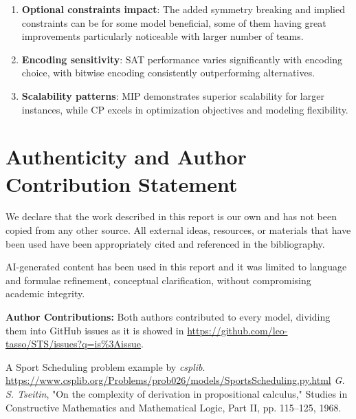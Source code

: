 \documentclass[11pt]{article}
\begin{document}
\begin{enumerate}    
    \item \textbf{Optional constraints impact}: The added symmetry breaking and implied constraints can be for some model beneficial, some of them having great improvements particularly noticeable with larger number of teams.
    
    \item \textbf{Encoding sensitivity}: SAT performance varies significantly with encoding choice, with bitwise encoding consistently outperforming alternatives.
    
    \item \textbf{Scalability patterns}: MIP demonstrates superior scalability for larger instances, while CP excels in optimization objectives and modeling flexibility.
\end{enumerate}

\newpage
\section*{Authenticity and Author Contribution Statement}

We declare that the work described in this report is our own and has not been copied from any other source. All external ideas, resources, or materials that have been used have been appropriately cited and referenced in the bibliography.

AI-generated content has been used in this report and it was limited to language and formulae refinement, conceptual clarification, without compromising academic integrity.

\noindent \textbf{Author Contributions:}
Both authors contributed to every model, dividing them into GitHub issues as it is showed in \url{https://github.com/leo-tasso/STS/issues?q=is%3Aissue}.



\begin{thebibliography}{99}

A Sport Scheduling problem example by \textit{csplib}.\\
\url{https://www.csplib.org/Problems/prob026/models/SportsScheduling.py.html}
\textit{G. S. Tseitin}, "On the complexity of derivation in propositional calculus," Studies in Constructive Mathematics and Mathematical Logic, Part II, pp. 115–125, 1968.

\end{thebibliography}
\end{document}
